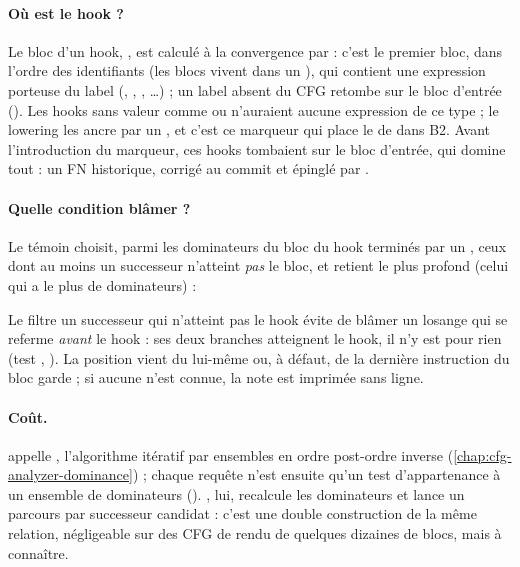\paragraph{Où est le hook ?} Le bloc d'un hook, , est calculé à la convergence par  : c'est le premier bloc, dans l'ordre des identifiants (les blocs vivent dans un ), qui contient une expression porteuse du label (, , , \ldots) ; un label absent du CFG retombe sur le bloc d'entrée (). Les hooks \og sans valeur\fg{} comme  ou  n'auraient aucune expression de ce type ; le lowering les ancre par un , et c'est ce marqueur qui place le  de  dans B2. Avant l'introduction du marqueur, ces hooks tombaient sur le bloc d'entrée, qui domine tout : un FN historique, corrigé au commit  et épinglé par .

\paragraph{Quelle condition blâmer ?} Le témoin choisit, parmi les dominateurs du bloc du hook terminés par un , ceux dont au moins un successeur n'atteint \emph{pas} le bloc, et retient le plus profond (celui qui a le plus de dominateurs) :


Le filtre \og un successeur qui n'atteint pas le hook\fg{} évite de blâmer un losange qui se referme \emph{avant} le hook : ses deux branches atteignent le hook, il n'y est pour rien (test , ). La position vient du  lui-même ou, à défaut, de la dernière instruction du bloc garde ; si aucune n'est connue, la note est imprimée sans ligne.

\paragraph{Coût.}  appelle , l'algorithme itératif par ensembles en ordre post-ordre inverse (\cref{chap:cfg-analyzer-dominance}) ; chaque requête  n'est ensuite qu'un test d'appartenance à un ensemble de dominateurs (). , lui, recalcule les dominateurs et lance un parcours  par successeur candidat : c'est une double construction de la même relation, négligeable sur des CFG de rendu de quelques dizaines de blocs, mais à connaître.

